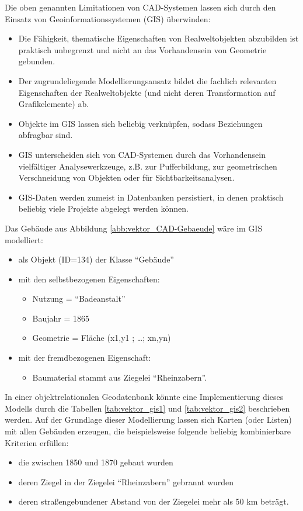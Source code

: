 Die oben genannten Limitationen von CAD-Systemen lassen sich durch den Einsatz von Geoinformationssystemen (GIS) überwinden:
\begin{itemize}
	\item Die Fähigkeit, thematische Eigenschaften von Realweltobjekten abzubilden ist praktisch unbegrenzt und nicht an das Vorhandensein von Geometrie gebunden.
	\item Der zugrundeliegende Modellierungsansatz bildet die fachlich relevanten Eigenschaften der Realweltobjekte (und nicht deren Transformation auf Grafikelemente) ab.
	\item Objekte im GIS lassen sich beliebig verknüpfen, sodass Beziehungen abfragbar sind.
	\item GIS unterscheiden sich von CAD-Systemen durch das Vorhandensein vielfältiger Analysewerkzeuge, z.B. zur Pufferbildung, zur geometrischen Verschneidung von Objekten oder für Sichtbarkeitsanalysen.
	\item GIS-Daten werden zumeist in Datenbanken persistiert, in denen praktisch beliebig viele Projekte abgelegt werden können.
\end{itemize}

Das Gebäude aus Abbildung \ref{abb:vektor_CAD-Gebaeude} wäre im GIS modelliert:
\begin{itemize}
	\item als Objekt (ID=134) der Klasse "`Gebäude"'
	\item mit den selbstbezogenen Eigenschaften:
	\begin{itemize}
		\item Nutzung = "`Badeanstalt"'
		\item Baujahr = 1865
		\item Geometrie = Fläche (x1,y1 ; \dots ; xn,yn)
	\end{itemize}
	\item mit der fremdbezogenen Eigenschaft:
	\begin{itemize}
		\item Baumaterial stammt aus Ziegelei "`Rheinzabern"'.
	\end{itemize}
\end{itemize}

In einer objektrelationalen Geodatenbank könnte eine Implementierung dieses Modells durch die Tabellen \ref{tab:vektor_gis1} und \ref{tab:vektor_gis2} beschrieben werden. Auf der Grundlage dieser Modellierung lassen sich Karten (oder Listen) mit allen Gebäuden erzeugen, die beispielsweise folgende beliebig kombinierbare Kriterien erfüllen:
\begin{itemize}
	\item die zwischen 1850 und 1870 gebaut wurden
	\item deren Ziegel in der Ziegelei "`Rheinzabern"' gebrannt wurden
	\item deren straßengebundener Abstand von der Ziegelei mehr als 50 km beträgt.
\end{itemize}

